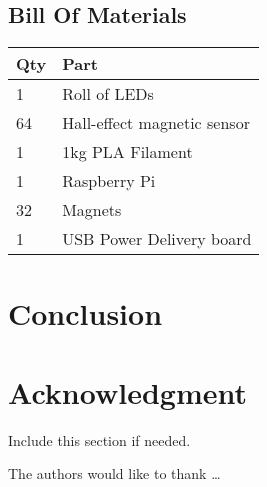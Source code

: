 \documentclass[11pt,journal]{IEEEtran}
\begin{document}
\subsection{Bill Of Materials}
\begin{table}
\begin{tabular}{|l|l|}
\hline
\textbf{Qty} & \textbf{Part}               \\ \hline
1            & Roll of LEDs                \\ \hline
64           & Hall-effect magnetic sensor \\ \hline
1            & 1kg PLA Filament            \\ \hline
1            & Raspberry Pi                \\ \hline
32           & Magnets                     \\ \hline
1            & USB Power Delivery board    \\ \hline
\end{tabular}
\end{table}


% 


\section{Conclusion}



\section*{Acknowledgment}

Include this section if needed.

The authors would like to thank \ldots




\end{document}
